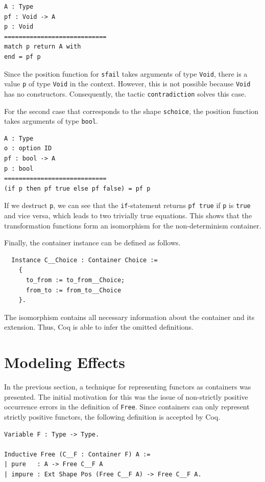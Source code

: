 \documentclass[a4paper, 11pt, fleqn, twoside]{scrreprt}
\newcommand{\hinl}[1]{\texttt{#1}}
\newcommand{\cinl}[1]{\texttt{#1}}
\begin{document}
\begin{verbatim}
A : Type
pf : Void -> A
p : Void
============================
match p return A with
end = pf p
\end{verbatim}

Since the position function for \cinl{sfail} takes arguments of type \cinl{Void}, there is a value \cinl{p} of type \cinl{Void} in the context.
However, this is not possible because \cinl{Void} has no constructors.
Consequently, the tactic \cinl{contradiction} solves this case.

For the second case that corresponds to the shape \cinl{schoice}, the position function takes arguments of type \cinl{bool}.

\begin{verbatim}
A : Type
o : option ID
pf : bool -> A
p : bool
============================
(if p then pf true else pf false) = pf p
\end{verbatim}

If we destruct \hinl{p}, we can see that the \cinl{if}-statement returns \cinl{pf true} if \cinl{p} is \cinl{true} and vice versa, which leads to two trivially true equations.
This shows that the transformation functions form an isomorphism for the non-determinism container.

Finally, the container instance can be defined as follows.

\begin{verbatim}
  Instance C__Choice : Container Choice :=
    {
      to_from := to_from__Choice;
      from_to := from_to__Choice
    }.
\end{verbatim}

The isomorphism contains all necessary information about the container and its extension.
Thus, Coq is able to infer the omitted definitions.

\section{Modeling Effects}

In the previous section, a technique for representing functors as containers was presented.
The initial motivation for this was the issue of non-strictly positive occurrence errors in the definition of \cinl{Free}.
Since containers can only represent strictly positive functors, the following definition is accepted by Coq.

\begin{verbatim}
Variable F : Type -> Type.

Inductive Free (C__F : Container F) A :=
| pure   : A -> Free C__F A
| impure : Ext Shape Pos (Free C__F A) -> Free C__F A.
\end{verbatim}
\end{document}
